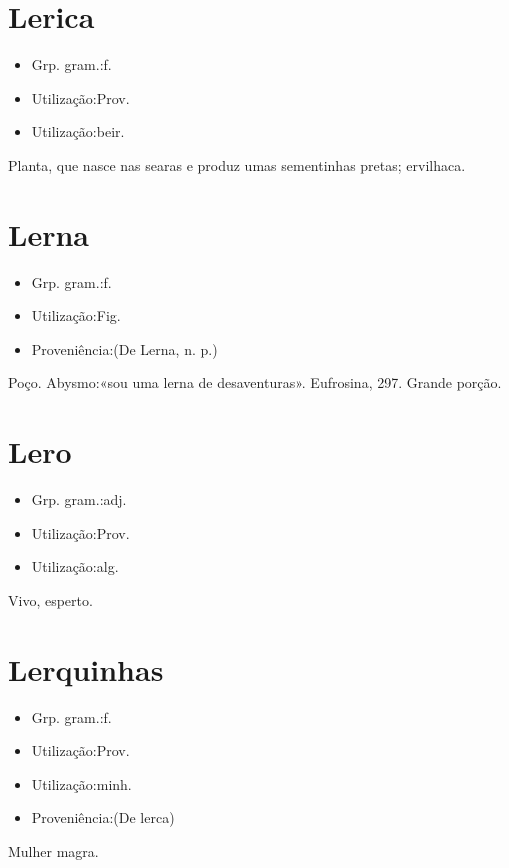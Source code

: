 \section{Lerica}
\begin{itemize}
\item {Grp. gram.:f.}
\end{itemize}
\begin{itemize}
\item {Utilização:Prov.}
\end{itemize}
\begin{itemize}
\item {Utilização:beir.}
\end{itemize}
Planta, que nasce nas searas e produz umas sementinhas pretas; ervilhaca.
\section{Lerna}
\begin{itemize}
\item {Grp. gram.:f.}
\end{itemize}
\begin{itemize}
\item {Utilização:Fig.}
\end{itemize}
\begin{itemize}
\item {Proveniência:(De \textunderscore Lerna\textunderscore , n. p.)}
\end{itemize}
Poço.
Abysmo:«\textunderscore sou uma lerna de desaventuras\textunderscore ». \textunderscore Eufrosina\textunderscore , 297.
Grande porção.
\section{Lero}
\begin{itemize}
\item {Grp. gram.:adj.}
\end{itemize}
\begin{itemize}
\item {Utilização:Prov.}
\end{itemize}
\begin{itemize}
\item {Utilização:alg.}
\end{itemize}
Vivo, esperto.
\section{Lerquinhas}
\begin{itemize}
\item {Grp. gram.:f.}
\end{itemize}
\begin{itemize}
\item {Utilização:Prov.}
\end{itemize}
\begin{itemize}
\item {Utilização:minh.}
\end{itemize}
\begin{itemize}
\item {Proveniência:(De \textunderscore lerca\textunderscore )}
\end{itemize}
Mulher magra.
